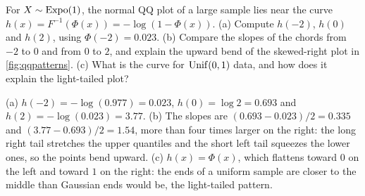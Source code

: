 \begin{exercise}
\label{ex:ks-qq-skew}
For $X \sim \text{Expo}(1)$, the normal QQ plot of a large sample lies near the curve $h(x) = F^{-1}(\Phi(x)) = -\log(1 - \Phi(x))$. (a) Compute $h(-2)$, $h(0)$ and $h(2)$, using $\Phi(-2) = 0.023$. (b) Compare the slopes of the chords from $-2$ to $0$ and from $0$ to $2$, and explain the upward bend of the skewed-right plot in \cref{fig:qqpatterns}. (c) What is the curve for $\mathrm{Unif}(0, 1)$ data, and how does it explain the light-tailed plot?
\end{exercise}
\begin{solution}
(a) $h(-2) = -\log(0.977) = 0.023$, $h(0) = \log 2 = 0.693$ and $h(2) = -\log(0.023) = 3.77$. (b) The slopes are $(0.693 - 0.023)/2 = 0.335$ and $(3.77 - 0.693)/2 = 1.54$, more than four times larger on the right: the long right tail stretches the upper quantiles and the short left tail squeezes the lower ones, so the points bend upward. (c) $h(x) = \Phi(x)$, which flattens toward $0$ on the left and toward $1$ on the right: the ends of a uniform sample are closer to the middle than Gaussian ends would be, the light-tailed pattern.
\end{solution}
